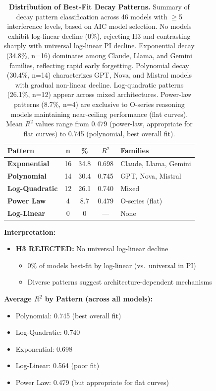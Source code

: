\documentclass{article}
\begin{document}
\begin{table}[t]
\centering
\small
\caption{\textbf{Distribution of Best-Fit Decay Patterns.}
Summary of decay pattern classification across 46 models with $\geq$5 interference levels, based on AIC model selection.
No models exhibit log-linear decline (0\%), rejecting H3 and contrasting sharply with universal log-linear PI decline.
Exponential decay (34.8\%, n=16) dominates among Claude, Llama, and Gemini families, reflecting rapid early forgetting.
Polynomial decay (30.4\%, n=14) characterizes GPT, Nova, and Mistral models with gradual non-linear decline.
Log-quadratic patterns (26.1\%, n=12) appear across mixed architectures.
Power-law patterns (8.7\%, n=4) are exclusive to O-series reasoning models maintaining near-ceiling performance (flat curves).
Mean $R^2$ values range from 0.479 (power-law, appropriate for flat curves) to 0.745 (polynomial, best overall fit).}
\setlength{\tabcolsep}{4pt}
\begin{tabular}{@{}lcccp{3cm}@{}}
\toprule
Pattern & n & \% & $R^2$ & Families \\
\midrule
\textbf{Exponential} & 16 & 34.8 & 0.698 & Claude, Llama, Gemini \\
\textbf{Polynomial} & 14 & 30.4 & 0.745 & GPT, Nova, Mistral \\
\textbf{Log-Quadratic} & 12 & 26.1 & 0.740 & Mixed \\
\textbf{Power Law} & 4 & 8.7 & 0.479 & O-series (flat) \\
\textbf{Log-Linear} & 0 & 0 & --- & None \\
\bottomrule
\end{tabular}
\end{table}

\textbf{Interpretation:}
\begin{itemize}[itemsep=2pt,topsep=3pt,parsep=0pt]
    \item \textbf{H3 REJECTED:} No universal log-linear decline
    \begin{itemize}[itemsep=2pt,topsep=3pt,parsep=0pt]
        \item 0\% of models best-fit by log-linear (vs.\ universal in PI)
        \item Diverse patterns suggest architecture-dependent mechanisms
    \end{itemize}
\end{itemize}

\textbf{Average $R^2$ by Pattern (across all models):}
\begin{itemize}[itemsep=2pt,topsep=3pt,parsep=0pt]
    \item Polynomial: 0.745 (best overall fit)
    \item Log-Quadratic: 0.740
    \item Exponential: 0.698
    \item Log-Linear: 0.564 (poor fit)
    \item Power Law: 0.479 (but appropriate for flat curves)
\end{itemize}
\end{document}
